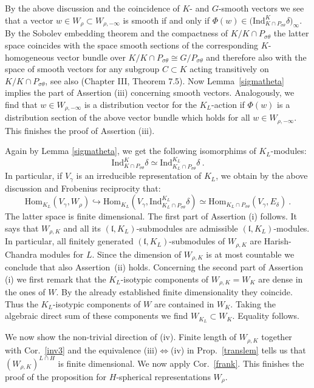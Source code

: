 \documentclass[10]{amsart}
\theoremstyle{remark}
\theoremstyle{definition}
\numberwithin{equation}{section}
\newcommand{\fl}{{\mathfrak l}}
\newcommand{\gt}{\theta}
\newcommand{\beu}{\begin{equation*}}
\begin{document}
{By the above discussion and the coincidence of $K$- and $G$-smooth vectors we see that a vector $w\in W_\rho\subset W_{\rho,-\infty}$ is smooth if and only if
$\Phi(w)\in \big(\text{Ind}_{K\cap P_{\sigma\gt}}^{K}\delta\big)_{\infty}$. By the Sobolev embedding theorem and the compactness of $K/K\cap P_{\sigma\gt}$ the latter space coincides with the space smooth sections
of the corresponding $K$-homogeneous vector bundle over $K/K\cap P_{\sigma\gt}\cong G/ P_{\sigma\gt}$ and therefore also with the space of smooth vectors for any subgroup $C\subset K$ acting transitively on $K/K\cap P_{\sigma\gt}$, see also \cite{BW80} (Chapter III, Theorem 7.5). Now Lemma~\ref{sigmatheta} implies the part of Assertion (iii) concerning smooth vectors.
Analogously, we find that $w\in W_{\rho,-\infty}$ is a distribution vector for the $K_L$-action if $\Phi(w)$ is a distribution section of the above vector bundle which holds for all
$w\in W_{\rho,-\infty}$. This finishes the proof of Assertion (iii).

Again by Lemma \ref{sigmatheta}, 
we get the following isomorphims of $K_L$-modules:
%
$$
\text{Ind}_{K\cap P_{\sigma\gt}}^{K}\delta
\simeq\text{Ind}_{K_L\cap P_{\sigma\gt}}^{K_L}\delta\ .
$$
%
In particular, if $V_\gamma$ is an irreducible representation of $K_L$, we obtain by the above discussion and Frobenius reciprocity that:
%
\beu
\text{Hom}_{K_L}(V_\gamma,W_\rho)\hookrightarrow\text{Hom}_{K_L}(V_\gamma,\text{Ind}_{K_L\cap P_{\sigma\gt}}^{K_L}\delta)\simeq\text{Hom}_{K_L\cap P_{\sigma\gt}}(V_\gamma,E_\delta)\ .
\end{equation*}
%
The latter space is finite dimensional. The first part of Assertion (i) follows. It says that $W_{\rho,K}$ and all its $(\fl, K_L)$-submodules are admissible $(\fl, K_L)$-modules. In particular, all
finitely generated $(\fl, K_L)$-submodules of $W_{\rho,K}$ are Harish-Chandra modules for $L$. Since the dimension of $W_{\rho,K}$ is at most countable we conclude that also Assertion~(ii) holds. Concerning the second part of  Assertion (i) we first remark that the $K_L$-isotypic components of $W_{\rho, K}=W_K$ are dense in the ones of $W$.
By the already established finite dimensionality they coincide. Thus the  $K_L$-isotypic components of $W$ are contained in $W_K$. Taking the algebraic direct sum of these components
we find $W_{K_L}\subset W_K$. Equality follows.

We now show the non-trivial direction of (iv). Finite length of $W_{\rho,K}$ together with Cor.~\ref{inv3} and the equivalence (iii)$\Leftrightarrow$(iv) in Prop.~\ref{translem} tells us that
$(W_{\rho,K})^{L\cap H}$ is finite dimensional. We now apply Cor.~\ref{frank}.
This finishes the proof of the proposition for $H$-spherical representations $W_\rho$.

}
\end{document}
